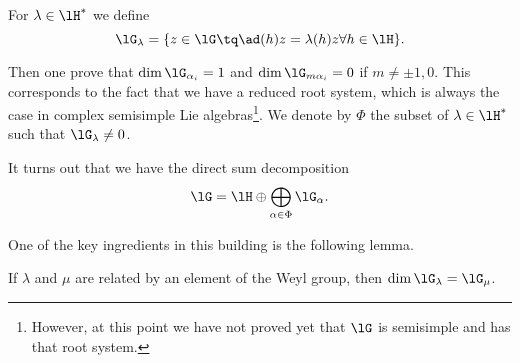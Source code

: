 For \( \lambda\in\lH^*\) we define
\begin{equation}
    \lG_{\lambda}=\{ z\in\lG\tq\ad(h)z=\lambda(h)z\forall h\in\lH \}.
\end{equation}

Then one prove that \( \dim\lG_{\alpha_i}=1\) and \( \dim\lG_{m\alpha_i}=0\) if \( m\neq \pm 1,0\). This corresponds to the fact that we have a reduced root system, which is always the case in complex semisimple Lie algebras\footnote{However, at this point we have not proved yet that \( \lG\) is semisimple and has that root system.}. We denote by \( \Phi\) the subset of \( \lambda\in\lH^*\) such that \( \lG_{\lambda}\neq 0\).

It turns out that we have the direct sum decomposition
\begin{equation}
    \lG=\lH\oplus\bigoplus_{\alpha\in\Phi}\lG_{\alpha}.
\end{equation}

One of the key ingredients in this building is the following lemma.
\begin{lemma}
    If \( \lambda\) and \( \mu\) are related by an element of the Weyl group, then \( \dim\lG_{\lambda}=\lG_{\mu}\).
\end{lemma}


